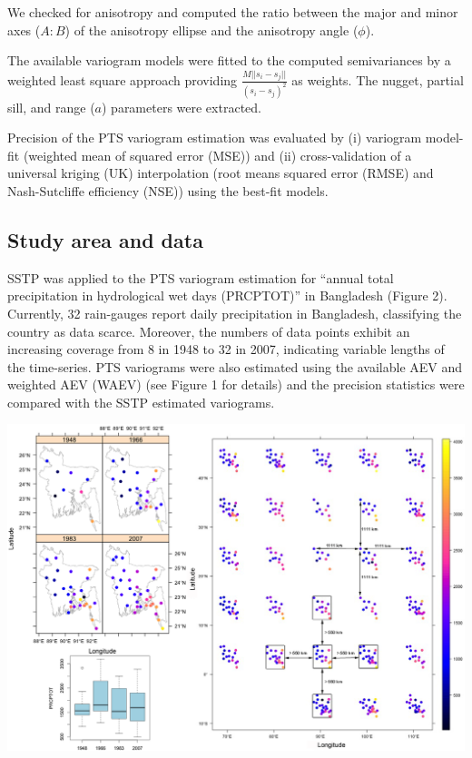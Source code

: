 \documentclass[a0,portrait]{a0poster}
\begin{document}
\begin{multicols}{2}
We checked for anisotropy and computed the ratio between the major and minor axes ($A:B$) of the anisotropy ellipse and the anisotropy angle ($\phi$).

The available variogram models were fitted to the computed semivariances by a weighted least square approach providing $\frac{M||s_i-s_j||}{(s_i-s_j)^2}$ as weights. The nugget, partial sill, and range ($a$) parameters were extracted.

Precision of the PTS variogram estimation was evaluated by (i) variogram model-fit (weighted mean of squared error (MSE)) and (ii) cross-validation of a universal kriging (UK) interpolation (root means squared error (RMSE) and Nash-Sutcliffe efficiency (NSE)) using the best-fit models.

\subsection*{Study area and data}

SSTP was applied to the PTS variogram estimation for ``annual total precipitation in hydrological wet days (PRCPTOT)'' in Bangladesh (Figure 2). Currently, 32 rain-gauges report daily precipitation in Bangladesh, classifying the country as data scarce. Moreover, the numbers of data points exhibit an increasing coverage from 8 in 1948 to 32 in 2007, indicating variable lengths of the time-series. PTS variograms were also estimated using the available AEV and weighted AEV (WAEV) (see Figure 1 for details) and the precision statistics were compared with the SSTP estimated variograms.

\begin{center}
\includegraphics[width=1\linewidth]{Fig_2}
\end{center} 


\end{multicols}
\end{document}
